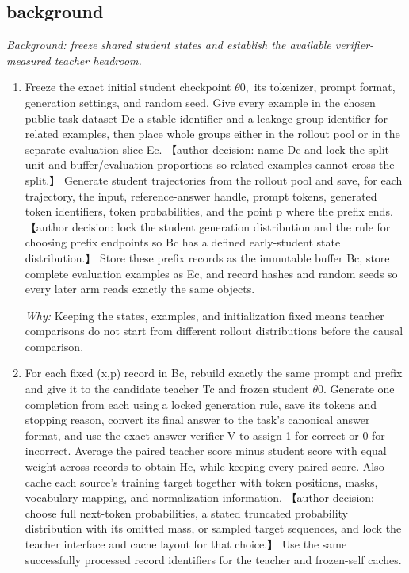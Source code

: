 \documentclass[10pt,a4paper]{article}
\begin{document}
\subsection*{background}
\emph{Background: freeze shared student states and establish the available verifier-measured teacher headroom.}
\begin{enumerate}[leftmargin=*,start=1]
  \item Freeze the exact initial student checkpoint \(\theta 0,\) its tokenizer, prompt format, generation settings, and random seed. Give every example in the chosen public task dataset Dc a stable identifier and a leakage-group identifier for related examples, then place whole groups either in the rollout pool or in the separate evaluation slice Ec. 【author decision: name Dc and lock the split unit and buffer/evaluation proportions so related examples cannot cross the split.】 Generate student trajectories from the rollout pool and save, for each trajectory, the input, reference-answer handle, prompt tokens, generated token identifiers, token probabilities, and the point p where the prefix ends. 【author decision: lock the student generation distribution and the rule for choosing prefix endpoints so Bc has a defined early-student state distribution.】 Store these prefix records as the immutable buffer Bc, store complete evaluation examples as Ec, and record hashes and random seeds so every later arm reads exactly the same objects.
\par\emph{Why:} Keeping the states, examples, and initialization fixed means teacher comparisons do not start from different rollout distributions before the causal comparison.
  \item For each fixed (x,p) record in Bc, rebuild exactly the same prompt and prefix and give it to the candidate teacher Tc and frozen student \(\theta 0.\) Generate one completion from each using a locked generation rule, save its tokens and stopping reason, convert its final answer to the task's canonical answer format, and use the exact-answer verifier V to assign 1 for correct or 0 for incorrect. Average the paired teacher score minus student score with equal weight across records to obtain Hc, while keeping every paired score. Also cache each source's training target together with token positions, masks, vocabulary mapping, and normalization information. 【author decision: choose full next-token probabilities, a stated truncated probability distribution with its omitted mass, or sampled target sequences, and lock the teacher interface and cache layout for that choice.】 Use the same successfully processed record identifiers for the teacher and frozen-self caches.

\end{enumerate}
\end{document}
